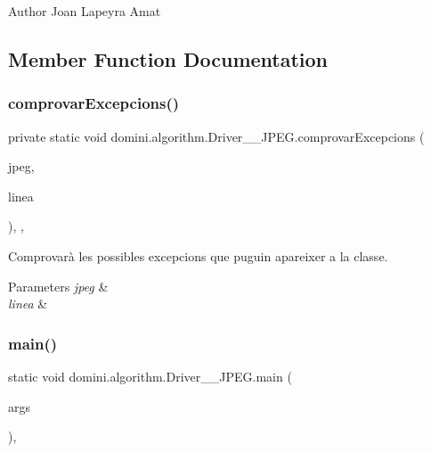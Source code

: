 \begin{DoxyAuthor}{Author}
Joan Lapeyra Amat 
\end{DoxyAuthor}


\subsection{Member Function Documentation}
\mbox{\label{classdomini_1_1algorithm_1_1Driver____JPEG_ae75883665dbbf55adaa8db46f2211c75}} 
\subsubsection{\texorpdfstring{comprovar\+Excepcions()}{comprovarExcepcions()}}
{\footnotesize\ttfamily private static void domini.\+algorithm.\+Driver\+\_\+\+\_\+\+J\+P\+E\+G.\+comprovar\+Excepcions (\begin{DoxyParamCaption}\item[{\hyperlink{classdomini_1_1algorithm_1_1JPEG}{J\+P\+EG}}]{jpeg,  }\item[{String}]{linea }\end{DoxyParamCaption})\hspace{0.3cm}{\ttfamily [inline]}, {\ttfamily [static]}, {\ttfamily [private]}}



Comprovarà les possibles excepcions que puguin apareixer a la classe. 


\begin{DoxyParams}{Parameters}
{\em jpeg} & \\
\hline
{\em linea} & \\
\hline
\end{DoxyParams}
\mbox{\label{classdomini_1_1algorithm_1_1Driver____JPEG_a0e1370b743ad9782e31cb6b380dd60a5}} 
\subsubsection{\texorpdfstring{main()}{main()}}
{\footnotesize\ttfamily static void domini.\+algorithm.\+Driver\+\_\+\+\_\+\+J\+P\+E\+G.\+main (\begin{DoxyParamCaption}\item[{String \mbox{[}$\,$\mbox{]}}]{args }\end{DoxyParamCaption})\hspace{0.3cm}{\ttfamily [inline]}, {\ttfamily [static]}}

